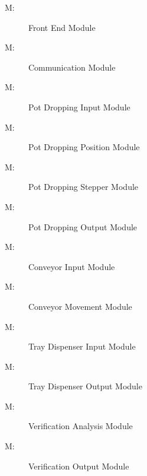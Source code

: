 \documentclass[12pt, titlepage]{article}
\newcounter{mnum}
\newcommand{\mthemnum}{M\themnum}
\begin{document}
\begin{description}
\item [ \mthemnum \label{mFE}:] Front End Module
\item [ \mthemnum \label{mCO}:] Communication Module
\item [ \mthemnum \label{mPDI}:] Pot Dropping Input Module
\item [ \mthemnum \label{mPDP}:] Pot Dropping Position Module
\item [ \mthemnum \label{mPDS}:] Pot Dropping Stepper Module
\item [ \mthemnum \label{mPDO}:] Pot Dropping Output Module
\item [ \mthemnum \label{mCI}:] Conveyor Input Module
\item [ \mthemnum \label{mCM}:] Conveyor Movement Module
\item [ \mthemnum \label{mTDI}:] Tray Dispenser Input Module
\item [ \mthemnum \label{mTDO}:] Tray Dispenser Output Module
\item [ \mthemnum \label{mVA}:] Verification Analysis Module
\item [ \mthemnum \label{mVO}:] Verification Output Module


\end{description}
\end{document}
